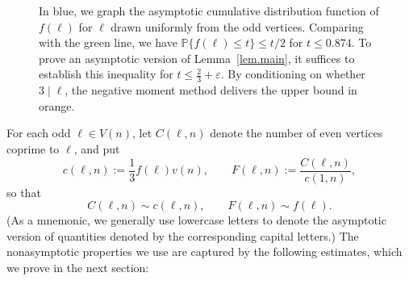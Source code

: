 \documentclass{article}
\theoremstyle{plain}
\theoremstyle{definition}
\theoremstyle{remark}
\begin{document}
\begin{figure}[t]
\centering
{}
\caption{In blue, we graph the asymptotic cumulative distribution function of $f(\ell)$ for $\ell$ drawn uniformly from the odd vertices. Comparing with the green line, we have $\mathbb{P}\{f(\ell)\leq t\}
\leq t/2$ for $t\leq0.874$. To prove an asymptotic version of Lemma~\ref{lem.main}, it suffices to establish this inequality for $t\leq\frac{2}{3}+\varepsilon$. By conditioning on whether $3\mid\ell$, the negative moment method delivers the upper bound in orange.}
\label{fig:cdf}
\end{figure}

For each odd $\ell\in V(n)$, let $C(\ell,n)$ denote the number of even vertices coprime to $\ell$, and put
\[
c(\ell,n)
:=\frac{1}{3}f(\ell)v(n),
\qquad
F(\ell,n):=\frac{C(\ell,n)}{c(1,n)},
\]
so that 
\[
C(\ell,n)\sim c(\ell,n),
\qquad
F(\ell,n)\sim f(\ell).
\]
(As a mnemonic, we generally use lowercase letters to denote the asymptotic version of quantities denoted by the corresponding capital letters.)
The nonasymptotic properties we use are captured by the following estimates, which we prove in the next section:
\end{document}
